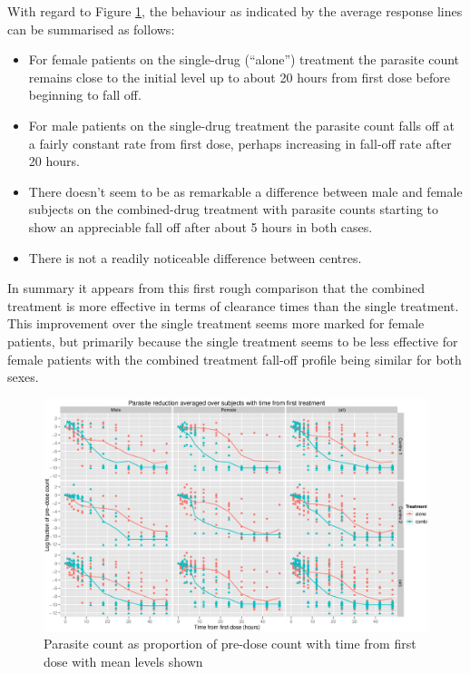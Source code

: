 With regard to Figure \ref{allaov}, the behaviour as indicated by the average response lines can be summarised as follows:
\begin{itemize}
 \item For female patients on the single-drug (``alone'') treatment the parasite count remains close to the initial level up to about 20 hours from first dose before beginning to fall off.
 \item For male patients on the single-drug treatment the parasite count falls off at a fairly constant rate from first dose, perhaps increasing in fall-off rate after 20 hours.
\item There doesn't seem to be as remarkable a difference between male and female subjects on the combined-drug treatment with parasite counts starting to show an appreciable fall off after about 5 hours in both cases.
\item There is not a readily noticeable difference between centres.
\end{itemize}
In summary it appears from this first rough comparison that the combined treatment is more effective in terms of clearance times than the single treatment. This improvement over the single treatment seems more marked for female patients, but primarily because the single treatment seems to be less effective for female patients with the combined treatment fall-off profile being similar for both sexes.
\begin{figure}
\includegraphics[width=9.2in]{allaov.eps}
\caption{Parasite count as proportion of pre-dose count with time from first dose with mean levels shown}
\label{allaov}
\end{figure}

